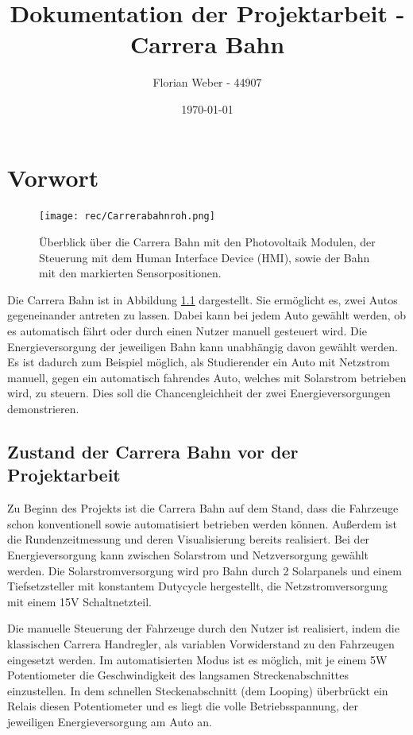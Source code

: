 \documentclass[a4paper, 11pt]{report}
\title{Dokumentation der Projektarbeit - Carrera Bahn}
\author{Florian Weber - 44907}
\date{\today}
\begin{document}
\maketitle	%


\tableofcontents 	%
\listoffigures		%
\newpage

\chapter{Vorwort}%
	\begin{figure}[tb]
	\centering
	\texttt{[image: rec/Carrerabahnroh.png]}
	\caption[Überblick über die Carrera Bahn]{Überblick über die Carrera Bahn mit den Photovoltaik Modulen, der Steuerung mit dem Human Interface Device (HMI), sowie der Bahn mit den markierten Sensorpositionen.}
	\label{img:carrerakomplett}
	\end{figure}
Die Carrera Bahn ist in Abbildung \ref{img:carrerakomplett} dargestellt. Sie ermöglicht es, zwei Autos gegeneinander antreten zu lassen. Dabei kann bei jedem Auto gewählt werden, ob es automatisch fährt oder durch einen Nutzer manuell gesteuert wird. Die Energieversorgung der jeweiligen Bahn kann unabhängig davon gewählt werden. Es ist dadurch zum Beispiel möglich, als Studierender ein Auto mit Netzstrom manuell, gegen ein automatisch fahrendes Auto, welches mit Solarstrom betrieben wird, zu steuern.
 Dies soll die Chancengleichheit der zwei Energieversorgungen demonstrieren. %

\section{Zustand der Carrera Bahn vor der Projektarbeit}
Zu Beginn des Projekts ist die Carrera Bahn auf dem Stand, dass die Fahrzeuge schon konventionell sowie automatisiert betrieben werden können. Außerdem ist die Rundenzeitmessung und deren Visualisierung bereits realisiert. Bei der Energieversorgung kann zwischen Solarstrom und Netzversorgung gewählt werden.
Die Solarstromversorgung wird pro Bahn durch 2 Solarpanels und einem Tiefsetzsteller mit konstantem Dutycycle hergestellt, die Netzstromversorgung mit einem 15V Schaltnetzteil.

Die manuelle Steuerung der Fahrzeuge durch den Nutzer ist realisiert, indem die klassischen Carrera Handregler, als variablen Vorwiderstand zu den Fahrzeugen eingesetzt werden. Im automatisierten Modus ist es möglich, mit je einem 5W Potentiometer die Geschwindigkeit des langsamen Streckenabschnittes einzustellen. In dem schnellen Steckenabschnitt (dem Looping) überbrückt ein Relais diesen Potentiometer und es liegt die volle Betriebsspannung, der jeweiligen Energieversorgung am Auto an.
\newpage
\end{document}
